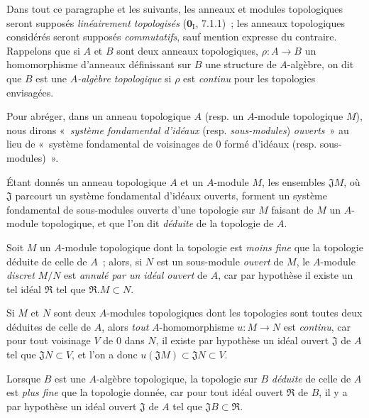 \begin{env}[19.0.3]
\label{0.19.0.3-fr}
Dans tout ce paragraphe et les suivants, les anneaux et modules topologiques
seront supposés \emph{linéairement topologisés} ($\mathbf{0}_{\mathrm I}$,
7.1.1)~; les anneaux topologiques considérés seront supposés \emph{commutatifs},
sauf mention expresse du contraire. Rappelons que si $A$ et $B$ sont deux
anneaux topologiques, $\rho:A\to B$ un homomorphisme d'anneaux définissant sur
$B$ une structure de $A$-algèbre, on dit que $B$ est une \emph{$A$-algèbre
topologique} si $\rho$ est \emph{continu} pour les topologies envisagées.

Pour abréger, dans un anneau topologique $A$ (resp. un $A$-module topologique
$M$), nous dirons «~\emph{système fondamental d'idéaux} (resp.
\emph{sous-modules}) \emph{ouverts}~» au lieu de «~système fondamental de
voisinages de 0 formé d'idéaux (resp. sous-modules)~».

Étant donnés un anneau topologique $A$ et un $A$-module $M$, les ensembles
$\mathfrak J M$, où $\mathfrak J$ parcourt un système fondamental d'idéaux
ouverts, forment un système fondamental de sous-modules ouverts d'une topologie
sur $M$ faisant de $M$ un $A$-module topologique, et que l'on dit \emph{déduite}
de la topologie de $A$.

Soit $M$ un $A$-module topologique dont la topologie est \emph{moins fine} que
la topologie déduite de celle de $A$~; alors, si $N$ est un sous-module
\emph{ouvert} de $M$, le $A$-module \emph{discret} $M/N$ est \emph{annulé par
un idéal ouvert} de $A$, car par hypothèse il existe un tel idéal $\mathfrak R$
tel que $\mathfrak R.M\subset N$.


Si $M$ et $N$ sont deux $A$-modules topologiques dont les topologies sont toutes
deux déduites de celle de $A$, alors \emph{tout} $A$-homomorphisme $u:M\to N$
est \emph{continu}, car pour tout voisinage $V$ de 0 dans $N$, il existe par
hypothèse un idéal ouvert $\mathfrak J$ de $A$ tel que $\mathfrak JN\subset V$,
et l'on a donc $u(\mathfrak JM)\subset\mathfrak JN\subset V$.

Lorsque $B$ est une $A$-algèbre topologique, la topologie sur $B$ \emph{déduite}
de celle de $A$ est \emph{plus fine} que la topologie donnée, car pour tout
idéal ouvert $\mathfrak R$ de $B$, il y a par hypothèse un idéal ouvert
$\mathfrak J$ de $A$ tel que $\mathfrak JB\subset\mathfrak R$.
\end{env}

